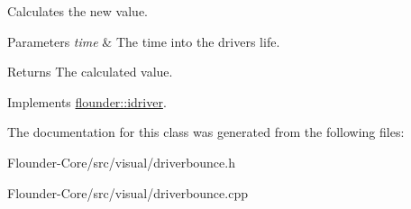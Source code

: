Calculates the new value. 


\begin{DoxyParams}{Parameters}
{\em time} & The time into the drivers life. \\
\hline
\end{DoxyParams}
\begin{DoxyReturn}{Returns}
The calculated value. 
\end{DoxyReturn}


Implements \hyperlink{classflounder_1_1idriver_a034c4159dc98c4c37ffdfaae64e4a16d}{flounder\+::idriver}.



The documentation for this class was generated from the following files\+:\begin{DoxyCompactItemize}
\item 
Flounder-\/\+Core/src/visual/driverbounce.\+h\item 
Flounder-\/\+Core/src/visual/driverbounce.\+cpp\end{DoxyCompactItemize}
